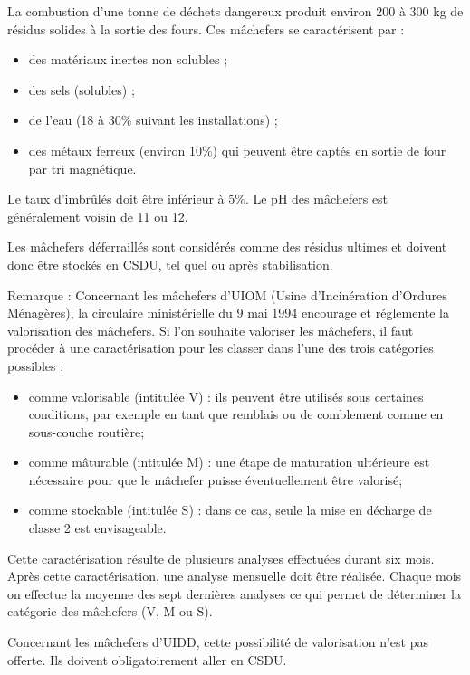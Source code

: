 La combustion d’une tonne de déchets dangereux produit environ 200 à 300 kg de résidus solides à la sortie des fours. Ces mâchefers se caractérisent par :
\begin{itemize}

\item	des matériaux inertes non solubles ;
\item		des sels (solubles) ;
\item		de l’eau (18 à 30\% suivant les installations) ;
\item		des métaux ferreux (environ 10\%) qui peuvent être captés en sortie de four par tri magnétique.
\end{itemize}

Le taux d’imbrûlés doit être inférieur à 5\%. Le pH des mâchefers est généralement voisin de 11 ou 12.

Les mâchefers déferraillés sont considérés comme des résidus ultimes et doivent donc être stockés en CSDU, tel quel ou après stabilisation.


Remarque :
Concernant les mâchefers d’UIOM (Usine d’Incinération d’Ordures Ménagères), la circulaire ministérielle du 9 mai 1994 encourage et réglemente la valorisation des mâchefers. Si l’on souhaite valoriser les mâchefers, il faut procéder à une caractérisation pour les classer dans l’une des trois catégories possibles :
 \begin{itemize}
\item comme valorisable (intitulée V) : ils peuvent être utilisés sous certaines conditions, par exemple en tant que remblais ou de comblement comme en sous-couche routière;
\item comme mâturable (intitulée M) : une étape de maturation ultérieure est nécessaire pour que le mâchefer puisse éventuellement être valorisé;
\item  comme stockable (intitulée S) : dans ce cas, seule la mise en décharge de classe 2 est envisageable.
  \end{itemize}

Cette caractérisation résulte de plusieurs analyses effectuées durant six mois. Après cette caractérisation, une analyse mensuelle doit être réalisée. Chaque mois on effectue la moyenne des sept dernières analyses ce qui permet de déterminer la catégorie des mâchefers (V, M ou S). 

Concernant les mâchefers d’UIDD, cette possibilité de valorisation n’est pas offerte. Ils doivent obligatoirement aller en CSDU.



